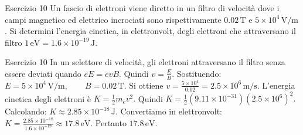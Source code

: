 \documentclass[a4paper]{article}
\begin{document}
\begin{snippetexercise}{Esercizio 10}
    Un fascio di elettroni viene diretto in un filtro di velocità dove i campi
    magnetico ed elettrico incrociati sono rispettivamente
    \(0.02\,\mathrm{T}\) e \(5 \times 10^4\,\mathrm{V/m}\).
    Si determini l'energia cinetica, in elettronvolt, degli elettroni che
    attraversano il filtro
    \(1\,\mathrm{eV} = 1.6 \times 10^{-19}\,\mathrm{J}.\)

\end{snippetexercise}
\begin{snippetsolution}{Esercizio 10}
    In un selettore di velocità, gli elettroni attraversano il filtro senza
    essere deviati quando
    \(eE = evB.\)
    Quindi
    \(v = \frac{E}{B}.\)
    Sostituendo:
    \(E = 5 \times 10^4\,\mathrm{V/m}, \qquad B = 0.02\,\mathrm{T}.\)
    Si ottiene
    \(v = \frac{5 \times 10^4}{0.02} = 2.5 \times 10^6\,\mathrm{m/s}.\)
    L'energia cinetica degli elettroni è
    \(K = \frac{1}{2}m_ev^2.\)
    Quindi
    \(K = \frac{1}{2} \left(9.11 \times 10^{-31}\right) \left(2.5 \times 10^6\right)^2.\)
    Calcolando:
    \(K \approx 2.85 \times 10^{-18}\,\mathrm{J}.\)
    Convertiamo in elettronvolt:
    \(K = \frac{2.85 \times 10^{-18}} {1.6 \times 10^{-19}} \approx 17.8\,\mathrm{eV}.\)
    Pertanto
    \(\boxed{17.8\,\mathrm{eV}}.\)
\end{snippetsolution}
\pagebreak
\end{document}
